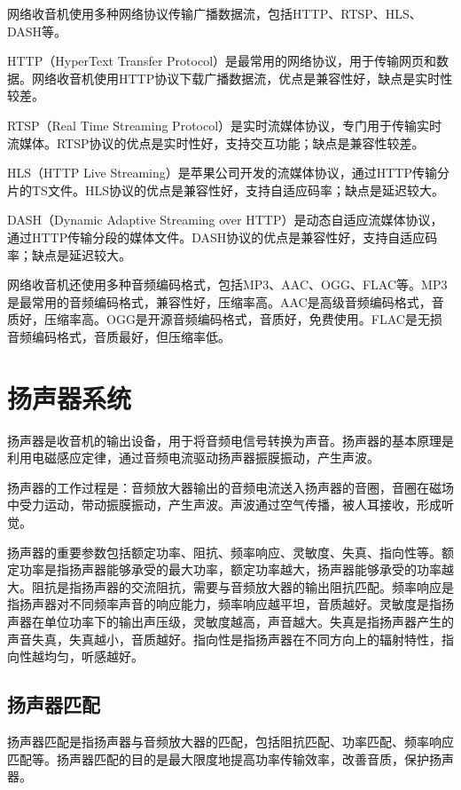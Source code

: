 \documentclass[12pt,UTF8]{ctexbook}
\begin{document}
网络收音机使用多种网络协议传输广播数据流，包括HTTP、RTSP、HLS、DASH等。

HTTP（HyperText Transfer Protocol）是最常用的网络协议，用于传输网页和数据。网络收音机使用HTTP协议下载广播数据流，优点是兼容性好，缺点是实时性较差。

RTSP（Real Time Streaming Protocol）是实时流媒体协议，专门用于传输实时流媒体。RTSP协议的优点是实时性好，支持交互功能；缺点是兼容性较差。

HLS（HTTP Live Streaming）是苹果公司开发的流媒体协议，通过HTTP传输分片的TS文件。HLS协议的优点是兼容性好，支持自适应码率；缺点是延迟较大。

DASH（Dynamic Adaptive Streaming over HTTP）是动态自适应流媒体协议，通过HTTP传输分段的媒体文件。DASH协议的优点是兼容性好，支持自适应码率；缺点是延迟较大。

网络收音机还使用多种音频编码格式，包括MP3、AAC、OGG、FLAC等。MP3是最常用的音频编码格式，兼容性好，压缩率高。AAC是高级音频编码格式，音质好，压缩率高。OGG是开源音频编码格式，音质好，免费使用。FLAC是无损音频编码格式，音质最好，但压缩率低。

\section{扬声器系统}

扬声器是收音机的输出设备，用于将音频电信号转换为声音。扬声器的基本原理是利用电磁感应定律，通过音频电流驱动扬声器振膜振动，产生声波。

扬声器的工作过程是：音频放大器输出的音频电流送入扬声器的音圈，音圈在磁场中受力运动，带动振膜振动，产生声波。声波通过空气传播，被人耳接收，形成听觉。

扬声器的重要参数包括额定功率、阻抗、频率响应、灵敏度、失真、指向性等。额定功率是指扬声器能够承受的最大功率，额定功率越大，扬声器能够承受的功率越大。阻抗是指扬声器的交流阻抗，需要与音频放大器的输出阻抗匹配。频率响应是指扬声器对不同频率声音的响应能力，频率响应越平坦，音质越好。灵敏度是指扬声器在单位功率下的输出声压级，灵敏度越高，声音越大。失真是指扬声器产生的声音失真，失真越小，音质越好。指向性是指扬声器在不同方向上的辐射特性，指向性越均匀，听感越好。

\subsection{扬声器匹配}

扬声器匹配是指扬声器与音频放大器的匹配，包括阻抗匹配、功率匹配、频率响应匹配等。扬声器匹配的目的是最大限度地提高功率传输效率，改善音质，保护扬声器。
\end{document}
